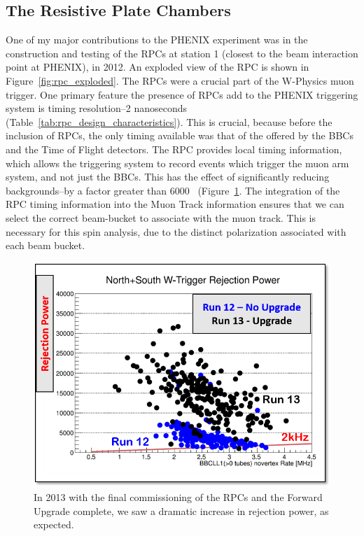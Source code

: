 \clearpage
\subsection{The Resistive Plate Chambers}

One of my major contributions to the PHENIX experiment was in the construction
and testing of the RPCs at station 1 (closest to the beam interaction point at
PHENIX), in 2012. An exploded view of the RPC is shown in
Figure~\ref{fig:rpc_exploded}. The RPCs were a crucial part of the W-Physics
muon trigger. One primary feature the presence of RPCs add to the PHENIX
triggering system is timing resolution--2 nanoseconds
(Table~\ref{tab:rpc_design_characteristics}). This is crucial, because before
the inclusion of RPCs, the only timing available was that of the offered by the
BBCs and the Time of Flight detectors. The RPC provides local timing
information, which allows the triggering system to record events which trigger
the muon arm system, and not just the BBCs. This has the effect of significantly
reducing backgrounds--by a factor greater than 6000~\cite{Fukao2011} (Figure~\ref{fig:rpc_rejection_power}. The integration of the RPC timing
information into the  Muon Track information ensures that we can select the
correct beam-bucket to associate with the muon track. This is necessary for this
spin analysis, due to the distinct polarization associated with each beam
bucket.

\begin{figure}
  \centering
  \includegraphics[width=0.8\linewidth]{./figures/rejection_power.png}
  \caption{
    In 2013 with the final commissioning of the RPCs and the Forward Upgrade
    complete, we saw a dramatic increase in rejection power, as expected.
  }
  \label{fig:rpc_rejection_power}

\end{figure}


